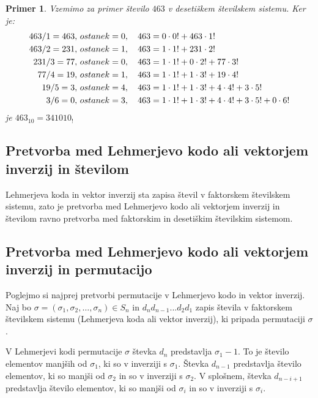 \documentclass[a4paper, 12pt]{book}
\newtheorem{primer}{Primer}[chapter]
\begin{document}
\begin{primer}
\label{primer_faktorski_stevilski_sistem2}
    Vzemimo za primer število $463$ v desetiškem številskem sistemu. Ker je:
    \begin{align}
        463 / 1 = 463,&\ ostanek = 0, \quad 463 = 0 \cdot 0! + 463 \cdot 1! \notag\\
        463 / 2 = 231,&\ ostanek = 1, \quad 463 = 1 \cdot 1! + 231 \cdot 2! \notag\\
        231 / 3 = 77,&\ ostanek = 0, \quad 463 = 1 \cdot 1! + 0 \cdot 2! + 77 \cdot 3!  \notag\\
        77 / 4 = 19,&\ ostanek = 1, \quad 463 = 1 \cdot 1! +  1 \cdot 3! + 19 \cdot 4! \notag\\
        19 / 5 = 3,&\ ostanek = 4, \quad 463 = 1 \cdot 1! + 1 \cdot 3! + 4 \cdot 4! + 3 \cdot 5! \notag\\
        3 / 6 = 0,&\ ostanek = 3, \quad 463 = 1 \cdot 1! + 1 \cdot 3! + 4 \cdot 4! + 3 \cdot 5! + 0 \cdot 6! \notag
    \end{align}
    je $463_{10} = 341010_{!}$
\end{primer}


\subsection{ Pretvorba med Lehmerjevo kodo ali vektorjem inverzij in številom }
Lehmerjeva koda in vektor inverzij sta zapisa števil v faktorskem številskem sistemu, zato je pretvorba med Lehmerjevo kodo ali vektorjem inverzij in številom ravno pretvorba med faktorskim in desetiškim številskim sistemom.

\subsection{ Pretvorba med Lehmerjevo kodo ali vektorjem inverzij in permutacijo }
Poglejmo si najprej pretvorbi permutacije v Lehmerjevo kodo in vektor inverzij. Naj bo $\sigma = (\sigma_1, \sigma_2, \dots, \sigma_n) \in S_n$ in $d_nd_{n-1}...d_2d_1$ zapis števila v faktorskem številskem sistemu (Lehmerjeva koda ali vektor inverzij), ki pripada permutaciji $\sigma$.

V Lehmerjevi kodi permutacije $\sigma$ števka $d_n$ predstavlja $\sigma_1 - 1$. To je število elementov manjših od $\sigma_1$, ki so v inverziji s $\sigma_1$. Števka $d_{n-1}$ predstavlja število elementov, ki so manjši od $\sigma_2$ in so v inverziji s $\sigma_2$. V splošnem, števka $d_{n-i+1}$ predstavlja število elementov, ki so manjši od $\sigma_i$ in so v inverziji s $\sigma_i$.
\end{document}
